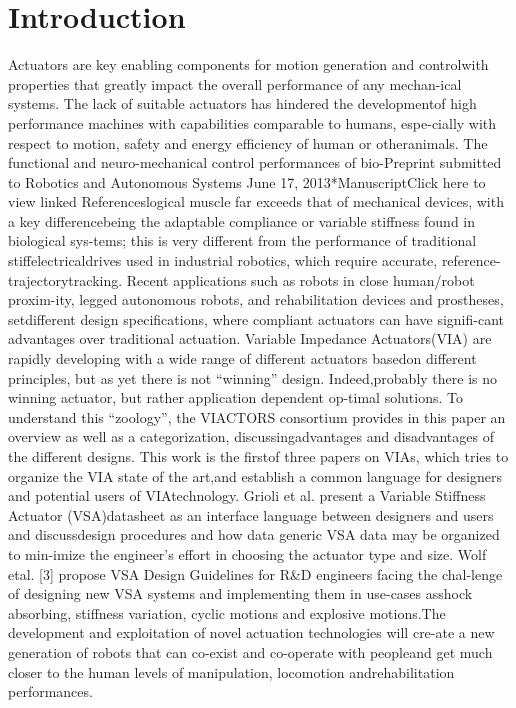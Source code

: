 \documentclass[12pt,a4paper]{article}
\begin{document}
    \section{Introduction}
    Actuators are key enabling components for motion generation and controlwith properties that greatly impact the overall performance of any mechan-ical systems. The lack of suitable actuators has hindered the developmentof high performance machines with capabilities comparable to humans, espe-cially with respect to motion, safety and energy efficiency of human or otheranimals. The functional and neuro-mechanical control performances of bio-Preprint submitted to Robotics and Autonomous Systems June 17, 2013*ManuscriptClick here to view linked Referenceslogical muscle far exceeds that of mechanical devices, with a key differencebeing the adaptable compliance or variable stiffness found in biological sys-tems; this is very different from the performance of traditional stiffelectricaldrives used in industrial robotics, which require accurate, reference-trajectorytracking. Recent applications such as robots in close human/robot proxim-ity, legged autonomous robots, and rehabilitation devices and prostheses, setdifferent design specifications, where compliant actuators can have signifi-cant advantages over traditional actuation. Variable Impedance Actuators(VIA) are rapidly developing with a wide range of different actuators basedon different principles, but as yet there is not “winning” design. Indeed,probably there is no winning actuator, but rather application dependent op-timal solutions. To understand this “zoology”, the VIACTORS consortium \cite{RN283} provides in this paper an overview as well as a categorization, discussingadvantages and disadvantages of the different designs. This work is the firstof three papers on VIAs, which tries to organize the VIA state of the art,and establish a common language for designers and potential users of VIAtechnology. Grioli et al. \cite{RN280} present a Variable Stiffness Actuator (VSA)datasheet as an interface language between designers and users and discussdesign procedures and how data generic VSA data may be organized to min-imize the engineer’s effort in choosing the actuator type and size. Wolf etal. [3] propose VSA Design Guidelines for R\&D engineers facing the chal-lenge of designing new VSA systems and implementing them in use-cases asshock absorbing, stiffness variation, cyclic motions and explosive motions.The development and exploitation of novel actuation technologies will cre-ate a new generation of robots that can co-exist and co-operate with peopleand get much closer to the human levels of manipulation, locomotion andrehabilitation performances.
\end{document}
